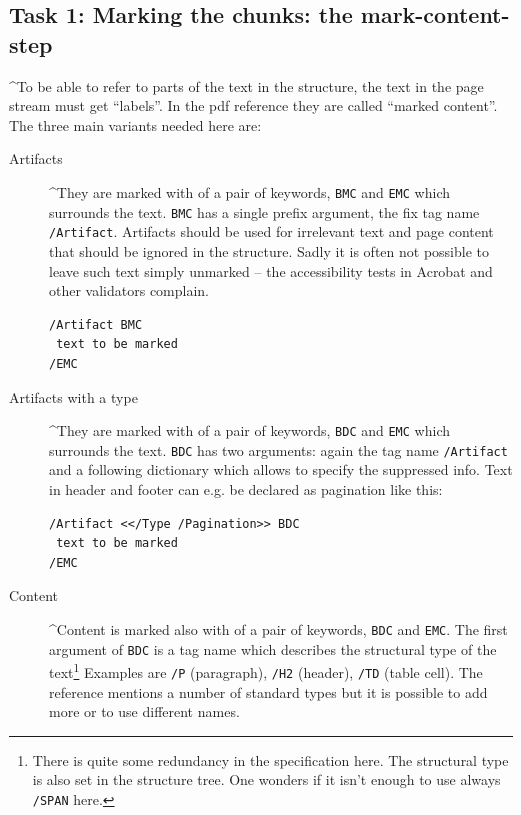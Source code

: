 \documentclass[DIV=12,parskip=half-,bibliography=totoc]{scrartcl}
\begin{document}
\subsection{Task 1: Marking the chunks: the mark-content-step}

\TagP^To be able to refer to parts of the text in the structure, the text in the page stream must get \enquote{labels}. In the pdf reference they are called \enquote{marked content}. The three main variants needed here are:\TagPend

\begin{description}
\item[Artifacts] \TagP^They are marked with of a pair of keywords, \texttt{BMC} and \texttt{EMC} which surrounds the text. \texttt{BMC} has a single prefix argument, the fix tag name \texttt{/Artifact}. Artifacts should be used for irrelevant text and page content that should be ignored in the structure. Sadly it is often not possible to leave such text simply unmarked -- the accessibility tests in Acrobat and other validators complain.\TagPend

\begin{lstlisting}
/Artifact BMC
 text to be marked
/EMC
\end{lstlisting}
\tagmcend\tagstructend\meti



\item[Artifacts with a type] \TagP^They are marked with of a pair of keywords, \texttt{BDC} and \texttt{EMC} which surrounds the text. \texttt{BDC} has two arguments: again the tag name \texttt{/Artifact} and a following dictionary which allows to specify the suppressed info. Text in header and footer can e.g. be declared as pagination like this:\TagPend

\begin{lstlisting}
/Artifact <</Type /Pagination>> BDC
 text to be marked
/EMC
\end{lstlisting}
\tagmcend\tagstructend\meti


\item[Content]  \TagP^Content is marked also with of a pair of keywords, \texttt{BDC} and \texttt{EMC}. The first argument of \texttt{BDC} is a tag name which describes the structural type of the text\footnote{There is quite some redundancy in the specification here. The structural type is also set in the structure tree. One wonders if it isn't enough to use  always \texttt{/SPAN} here.}
    Examples are \texttt{/P} (paragraph), \texttt{/H2} (header), \texttt{/TD} (table cell). The reference mentions a number of standard types but it is possible to add more or to use different names.


\end{description}
\end{document}
